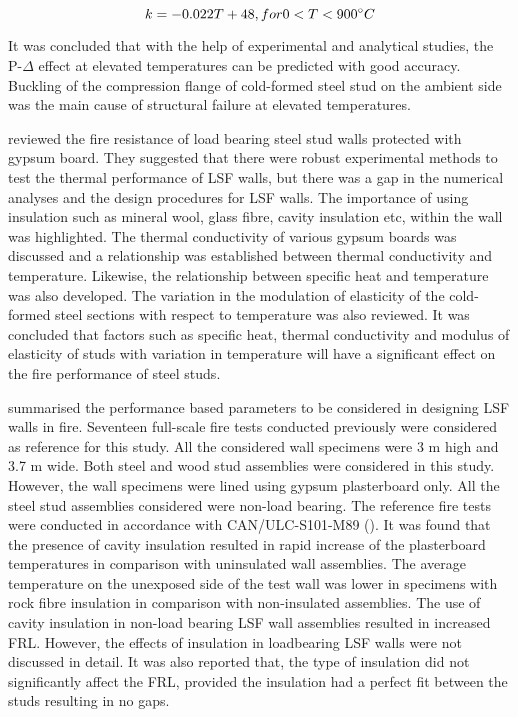 \begin{equation}
k = -0.022T + 48, for 0 < T < 900\degree C
\end{equation}

It was concluded that with the help of experimental and analytical studies, the P-$\Delta$ effect at elevated temperatures can be predicted with good accuracy. Buckling of the compression flange of cold-formed steel stud on the ambient side was the main cause of structural failure at elevated temperatures.

\citet{Alfawakhiri1999} reviewed the fire resistance of load bearing steel stud walls protected with gypsum board. They suggested that there were robust experimental methods to test the thermal performance of LSF walls, but there was a gap in the numerical analyses and the design procedures for LSF walls. The importance of using insulation such as mineral wool, glass fibre, cavity insulation etc, within the wall was highlighted. The thermal conductivity of various gypsum boards was discussed and a relationship was established between thermal conductivity and temperature. Likewise, the relationship between specific heat and temperature was also developed. The variation in the modulation of elasticity of the cold-formed steel sections with respect to temperature was also reviewed. It was concluded that factors such as specific heat, thermal conductivity and modulus of elasticity of studs with variation in temperature will have a significant effect on the fire performance of steel studs.   

\citet{Sultan2000a} summarised the performance based parameters to be considered in designing LSF walls in fire. Seventeen full-scale fire tests conducted previously were considered as reference for this study. All the considered wall specimens were 3 m high and 3.7 m wide. Both steel and wood stud assemblies were considered in this study. However, the wall specimens were lined using gypsum plasterboard only. All the steel stud assemblies considered were non-load bearing. The reference fire tests were conducted in accordance with CAN/ULC-S101-M89 (\citeyear{ULC1989}). It was found that the presence of cavity insulation resulted in rapid increase of the plasterboard temperatures in comparison with uninsulated wall assemblies. The average temperature on the unexposed side of the test wall was lower in specimens with rock fibre insulation in comparison with non-insulated assemblies. The use of cavity insulation in non-load bearing LSF wall assemblies resulted in increased FRL. However, the effects of insulation in loadbearing LSF walls were not discussed in detail. It was also reported that, the type of insulation did not significantly affect the FRL, provided the insulation had a perfect fit between the studs resulting in no gaps.

